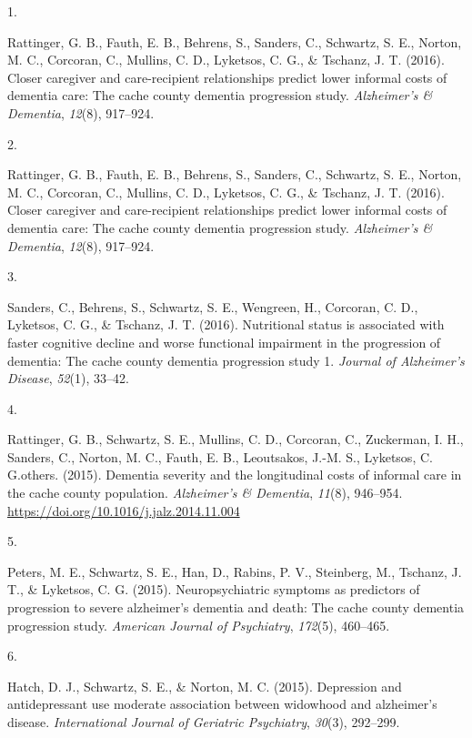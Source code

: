 \documentclass[11pt,a4paper,]{moderncv}
\newlength{\csllabelwidth}
\newcommand{\CSLLeftMargin}[1]{\parbox[t]{\csllabelwidth}{#1}}
\newcommand{\CSLRightInline}[1]{\parbox[t]{\linewidth - \csllabelwidth}{#1}}
\begin{document}
\hypertarget{refs_journals2017}{}
\leavevmode{}%
\CSLLeftMargin{1. }
\CSLRightInline{Rattinger, G. B., Fauth, E. B., Behrens, S., Sanders,
C., Schwartz, S. E., Norton, M. C., Corcoran, C., Mullins, C. D.,
Lyketsos, C. G., \& Tschanz, J. T. (2016). Closer caregiver and
care-recipient relationships predict lower informal costs of dementia
care: The cache county dementia progression study. \emph{Alzheimer's \&
Dementia}, \emph{12}(8), 917--924.}

\leavevmode{}%
\CSLLeftMargin{2. }
\CSLRightInline{Rattinger, G. B., Fauth, E. B., Behrens, S., Sanders,
C., Schwartz, S. E., Norton, M. C., Corcoran, C., Mullins, C. D.,
Lyketsos, C. G., \& Tschanz, J. T. (2016). Closer caregiver and
care-recipient relationships predict lower informal costs of dementia
care: The cache county dementia progression study. \emph{Alzheimer's \&
Dementia}, \emph{12}(8), 917--924.}

\leavevmode{}%
\CSLLeftMargin{3. }
\CSLRightInline{Sanders, C., Behrens, S., Schwartz, S. E., Wengreen, H.,
Corcoran, C. D., Lyketsos, C. G., \& Tschanz, J. T. (2016). Nutritional
status is associated with faster cognitive decline and worse functional
impairment in the progression of dementia: The cache county dementia
progression study 1. \emph{Journal of Alzheimer's Disease},
\emph{52}(1), 33--42.}

\leavevmode{}%
\CSLLeftMargin{4. }
\CSLRightInline{Rattinger, G. B., Schwartz, S. E., Mullins, C. D.,
Corcoran, C., Zuckerman, I. H., Sanders, C., Norton, M. C., Fauth, E.
B., Leoutsakos, J.-M. S., Lyketsos, C. G.others. (2015). Dementia
severity and the longitudinal costs of informal care in the cache county
population. \emph{Alzheimer's \& Dementia}, \emph{11}(8), 946--954.
\url{https://doi.org/10.1016/j.jalz.2014.11.004}}

\leavevmode{}%
\CSLLeftMargin{5. }
\CSLRightInline{Peters, M. E., Schwartz, S. E., Han, D., Rabins, P. V.,
Steinberg, M., Tschanz, J. T., \& Lyketsos, C. G. (2015).
Neuropsychiatric symptoms as predictors of progression to severe
alzheimer's dementia and death: The cache county dementia progression
study. \emph{American Journal of Psychiatry}, \emph{172}(5), 460--465.}

\leavevmode{}%
\CSLLeftMargin{6. }
\CSLRightInline{Hatch, D. J., Schwartz, S. E., \& Norton, M. C. (2015).
Depression and antidepressant use moderate association between widowhood
and alzheimer's disease. \emph{International Journal of Geriatric
Psychiatry}, \emph{30}(3), 292--299.}
\end{document}
